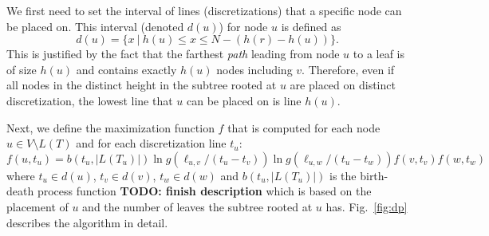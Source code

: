 \documentclass{llncs}
\begin{document}
We first need to set the interval of lines (discretizations) that a specific
node can be placed on.  This interval (denoted $d(u)$) for node $u$ is defined
as $$ d(u) = \{ x\ |\  h(u) \leq x \leq N - (h(r) - h(u))\}.$$  This is
justified by the fact that the farthest {\em path} leading from node $u$ to a
leaf is of size $h(u)$ and contains exactly $h(u)$ nodes including $v$.
Therefore, even if all nodes in the distinct height in the subtree rooted at
$u$ are placed on distinct discretization, the lowest line that $u$ can be
placed on is line $h(u)$.

Next, we define the maximization function $f$ that is computed for each node $u \in
V\setminus L(T)$ and for each discretization line $t_u$:  
$$ f(u,t_u) = b(t_u,|L(T_u)|) \ln g(\ell_{u,v} / (t_u - t_v)) \ln g(\ell_{u,w} / (t_u -
t_w)) f(v,t_v) f(w,t_w) $$ where $t_u \in d(u)$, $t_v \in d(v)$, $t_w \in
d(w)$ and $b(t_u,|L(T_u)|)$ is the birth-death process function {\bf TODO:
finish description} which is based on the placement of $u$ and the number of
leaves the subtree rooted at $u$ has.
Fig.~\ref{fig:dp} describes the algorithm in detail.
\end{document}
